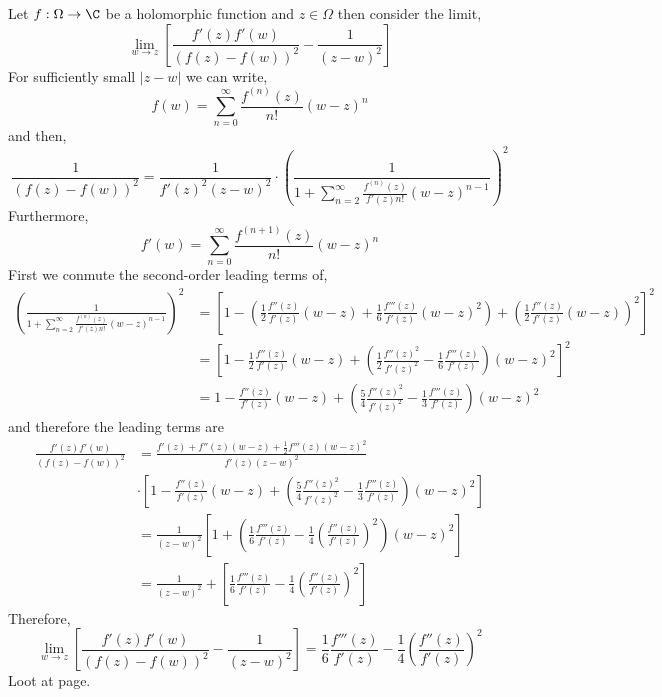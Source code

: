 \documentclass[12pt]{article}
\begin{document}
Let $f : \Omega \to \C$ be a holomorphic function and $z \in \Omega$ then consider the limit,
\[ \lim_{w \to z} \left[ \frac{f'(z) f'(w)}{(f(z) - f(w))^2} - \frac{1}{(z - w)^2} \right] \]
For sufficiently small $|z - w|$ we can write,
\[ f(w) = \sum_{n = 0}^\infty \frac{f^{(n)}(z)}{n!} (w - z)^n \]
and then,
\[ \frac{1}{(f(z) - f(w))^2} = \frac{1}{f'(z)^2 (z - w)^2} \cdot \left( \frac{1}{1 + \sum\limits_{n = 2}^\infty \frac{f^{(n)}(z)}{f'(z) n!} (w - z)^{n-1}} \right)^2 \]
Furthermore,
\[ f'(w) = \sum_{n = 0}^\infty \frac{f^{(n+1)}(z)}{n!} (w - z)^{n} \]
First we conmute the second-order leading terms of,
\begin{align*}
\left( \frac{1}{1 + \sum\limits_{n = 2}^\infty \frac{f^{(n)}(z)}{f'(z) n!} (w - z)^{n-1}} \right)^2 & = \left[ 1 - \left(\frac{1}{2} \frac{f''(z)}{f'(z)} (w - z) + \frac{1}{6} \frac{f'''(z)}{f'(z)} (w - z)^2 \right) + \left(\frac{1}{2} \frac{f''(z)}{f'(z)} (w - z) \right)^2 \right]^2
\\
& = \left[ 1 - \frac{1}{2} \frac{f''(z)}{f'(z)} (w - z) + \left( \frac{1}{2} \frac{f''(z)^2}{f'(z)^2} -  \frac{1}{6} \frac{f'''(z)}{f'(z)} \right) (w - z)^2  \right]^2
\\
& = 1 - \frac{f''(z)}{f'(z)} (w - z) + \left( \frac{5}{4} \frac{f''(z)^2}{f'(z)^2} - \frac{1}{3} \frac{f'''(z)}{f'(z)} \right) (w - z)^2  
\end{align*}
and therefore the leading terms are
\begin{align*}
\frac{f'(z) f'(w)}{(f(z) - f(w))^2} & = \frac{f'(z)  + f''(z) (w - z) + \tfrac{1}{2} f'''(z) (w - z)^2 }{f'(z) (z - w)^2} 
\\
& \cdot \left[ 1 - \frac{f''(z)}{f'(z)} (w - z) + \left( \frac{5}{4} \frac{f''(z)^2}{f'(z)^2} - \frac{1}{3} \frac{f'''(z)}{f'(z)} \right) (w - z)^2  \right]
\\
& = \frac{1}{(z - w)^2} \left[ 1 + \left( \frac{1}{6} \frac{f'''(z)}{f'(z)} - \frac{1}{4} \left( \frac{f''(z)}{f'(z)} \right)^2 \right) (w - z)^2 \right] 
\\
& = \frac{1}{(z - w)^2} + \left[ \frac{1}{6} \frac{f'''(z)}{f'(z)} - \frac{1}{4} \left( \frac{f''(z)}{f'(z)} \right)^2 \right]
\end{align*}
Therefore,
\[ \lim_{w \to z} \left[ \frac{f'(z) f'(w)}{(f(z) - f(w))^2} - \frac{1}{(z - w)^2} \right] =  \frac{1}{6} \frac{f'''(z)}{f'(z)} - \frac{1}{4} \left( \frac{f''(z)}{f'(z)} \right)^2 \]
Loot at  page.
\end{document}
